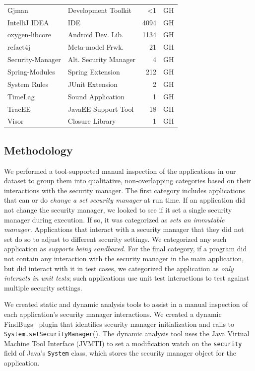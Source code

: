 \documentclass{sig-alternate}
\begin{document}
\begin{table}
\begin{tabular}{llrl}
Gjman & Development Toolkit & <1 & GH\tabularnewline
IntelliJ IDEA & IDE & 4094 & GH\tabularnewline
oxygen-libcore & Android Dev. Lib. & 1134 & GH\tabularnewline
refact4j & Meta-model Frwk. & 21 & GH\tabularnewline
Security-Manager & Alt. Security Manager & 4 & GH\tabularnewline
Spring-Modules & Spring Extension & 212 & GH\tabularnewline
System Rules & JUnit Extension & 2 & GH\tabularnewline
TimeLag & Sound Application & 1 & GH\tabularnewline
TracEE & JavaEE Support Tool & 18 & GH\tabularnewline
Visor & Closure Library & 1 & GH\tabularnewline
\bottomrule
\end{tabular}
\end{table}

\subsection{Methodology}
\label{sec:methodology}

We performed a tool-supported manual inspection of the applications in our
dataset to group them
into qualitative, non-overlapping categories based on their interactions with the security 
manager. The first category includes applications that can or do
\emph{change a set security manager} at run time.
If an application did not change the security manager, 
we looked to see if it set a single security manager 
during execution.  If so, it
was categorized as \emph{sets an immutable manager.} Applications that 
interact with a security manager that they did not set do so 
to adjust to different security settings.
We categorized any such application
as \emph{supports being sandboxed.} %
For the final category, if a
program did not contain any interaction with the security manager in 
the main application, but did interact with it
in test cases, we categorized the
application as \emph{only interacts in unit tests}; such applications use unit
test interactions to test against multiple security settings.

We created static and dynamic analysis tools
to assist in a manual inspection of each application's security manager
interactions. We created a dynamic 
FindBugs~\cite{hovemeyer_finding_2004} plugin that
identifies security manager initialization and calls to \texttt{System.setSecurityManager}().
The dynamic analysis tool uses the Java Virtual Machine
Tool Interface (JVMTI) \cite{_jvmti} to set a modification watch
on the \texttt{security} field of Java's \texttt{System} class, which
stores the security manager object for the application.
\end{document}
